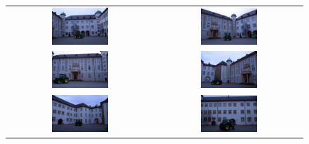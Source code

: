 \begin{figure}[tbhp]
\centering
\setlength{\tabcolsep}{1px}
\begin{tabular}{cc}
\includegraphics[width=0.4\textwidth]{./img/ch-incr-dens/castle/0000_smal}&
\includegraphics[width=0.4\textwidth]{./img/ch-incr-dens/castle/0003_smal}\\
\includegraphics[width=0.4\textwidth]{./img/ch-incr-dens/castle/0006_smal}&
\includegraphics[width=0.4\textwidth]{./img/ch-incr-dens/castle/0009_smal}\\
\includegraphics[width=0.4\textwidth]{./img/ch-incr-dens/castle/0012_smal}&
\includegraphics[width=0.4\textwidth]{./img/ch-incr-dens/castle/0015_smal}\\

\end{tabular}
\end{figure}
